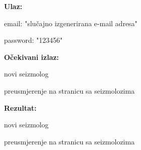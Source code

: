 			\noindent {}
			 \begin{packed_item}

				 \item \textbf{Ulaz:}

				 \item[] \begin{packed_enum}
					\item email: "slučajno izgenerirana e-mail adresa"
					\item password: "123456"
				\end{packed_enum}

				  \item \textbf{Očekivani izlaz:}

				 \item[] \begin{packed_enum}
					\item novi seizmolog
					\item preusmjerenje na stranicu sa seizmolozima
				\end{packed_enum}
				 
				\item \textbf{Rezultat:}

				\item[] \begin{packed_enum}
					\item novi seizmolog
					\item preusmjerenje na stranicu sa seizmolozima
			   \end{packed_enum}

			 \end{packed_item}

